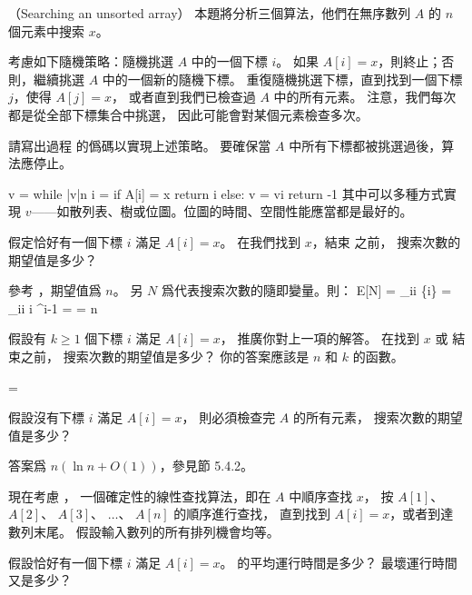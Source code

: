 \stopPROBLEM

\startPROBLEM（Searching an unsorted array）
本題將分析三個算法，他們在無序數列 $A$ 的 $n$ 個元素中搜索 $x$。

考慮如下隨機策略：隨機挑選 $A$ 中的一個下標 $i$。
如果 $A[i] = x$，則終止；否則，繼續挑選 $A$ 中的一個新的隨機下標。
重復隨機挑選下標，直到找到一個下標 $j$，使得 $A[j] = x$，
或者直到我們已檢查過 $A$ 中的所有元素。
注意，我們每次都是從全部下標集合中挑選，
因此可能會對某個元素檢查多次。

\startigBase[a]
\item 請寫出過程  的僞碼以實現上述策略。
要確保當 $A$ 中所有下標都被挑選過後，算法應停止。
\stopigBase

\startANSWER
{}
\startCLRSCODE
v = \emptyset
while |v|\ne n
	i = 
	if A[i] = x
		return i
	else:
		v = v\cup i
return -1
\stopCLRSCODE
其中可以多種方式實現 $v$——如散列表、樹或位圖。位圖的時間、空間性能應當都是最好的。
\stopANSWER

\startigBase[continue]
\item 假定恰好有一個下標 $i$ 滿足 $A[i] = x$。
在我們找到 $x$，結束  之前，
搜索次數的期望值是多少？
\stopigBase

\startANSWER
參考 ，期望值爲 $n$。
另 $N$ 爲代表搜索次數的隨即變量。則：
\startsplitformula\startmathalignment
\NC E[N] \NC = \sum_{i}i \Pr\{i\} \NR\allowbreak
\NC \NC = \sum_{i\ge i} i ^{i-1}  \NR
\NC \NC =   \NR
\NC \NC = n \NR
\stopmathalignment\stopsplitformula
\stopANSWER

\startigBase[continue]
\item 假設有 $k\ge 1$ 個下標 $i$ 滿足 $A[i] = x$，
推廣你對上一項的解答。
在找到 $x$ 或  結束之前，
搜索次數的期望值是多少？
你的答案應該是 $n$ 和 $k$ 的函數。
\stopigBase

\startANSWER
\startformula
{}  = 
\stopformula
\stopANSWER

\startigBase[continue]
\item 假設沒有下標 $i$ 滿足 $A[i] = x$，
則必須檢查完 $A$ 的所有元素，
搜索次數的期望值是多少？
\stopigBase

\startANSWER
答案爲 $n(\ln{n} + O(1))$，參見節 5.4.2。
\stopANSWER

現在考慮 ，
一個確定性的線性查找算法，即在 $A$ 中順序查找 $x$，
按 $A[1]$、 $A[2]$、 $A[3]$、 $\ldots$、 $A[n]$ 的順序進行查找，
直到找到 $A[i] = x$，或者到達數列末尾。
假設輸入數列的所有排列機會均等。
\startigBase[continue]
\item 假設恰好有一個下標 $i$ 滿足 $A[i] = x$。
 的平均運行時間是多少？
最壞運行時間又是多少？
\stopigBase

